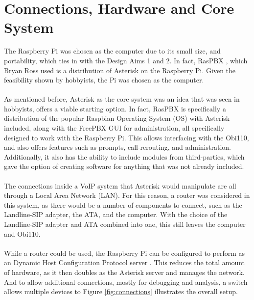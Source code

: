 \documentclass[main.tex]{subfiles}
\begin{document}
\section{Connections, Hardware and Core System}
The Raspberry Pi was chosen as the computer due to its small size, and portability, which ties in with the Design Aims 1 and 2. In fact, RasPBX \cite{raspbx}, which Bryan Ross used \cite{bryanross} is a distribution of Asterisk on the Raspberry Pi. Given the feasibility shown by hobbyists, the Pi was chosen as the computer.
\\\\
As mentioned before, Asterisk as the core system was an idea that was seen in hobbyists, offers a viable starting option. In fact, RasPBX \cite{raspbx} is specifically a distribution of the popular Raspbian Operating System (OS) with Asterisk included, along with the FreePBX GUI for administration, all specifically designed to work with the Raspberry Pi. This allows interfacing with the Obi110, and also offers features such as prompts, call-rerouting, and administration. Additionally, it also has the ability to include modules from third-parties, which gave the option of creating software for anything that was not already included.
\\\\
The connections inside a VoIP system that Asterisk would manipulate are all through a Local Area Network (LAN). For this reason, a router was considered in this system, as there would be a number of components to connect, such as the Landline-SIP adapter, the ATA, and the computer. With the choice of the Landline-SIP adapter and ATA combined into one, this still leaves the computer and Obi110.
\\\\
While a router could be used, the Raspberry Pi can be configured to perform as an Dynamic Host Configuration Protocol server \cite{pi-dhcp}. This reduces the total amount of hardware, as it then doubles as the Asterisk server and manages the network. And to allow additional connections, mostly for debugging and analysis, a switch allows multiple devices to Figure \ref{fig:connections} illustrates the overall setup.
\end{document}
